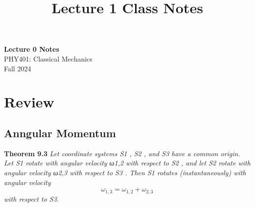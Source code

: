 \documentclass[11pt]{article}
\theoremstyle{definition}
\begin{document}
\setcounter{section}{0}
\title{Lecture 1 Class Notes}

\thispagestyle{empty}

\begin{center}
{\LARGE \bf Lecture 0 Notes}\\
{\large PHY401: Classical Mechanics}\\
Fall 2024
\end{center}


\tableofcontents


\section{Review}
\subsection{Anngular Momentum}
\textbf{Theorem 9.3} \textit{Let coordinate systems S1 , S2 , and S3 have a common origin. Let S1 rotate with angular velocity ω1,2 with respect to S2 , and let S2 rotate with angular velocity ω2,3 with respect to S3 . Then S1 rotates (instantaneously) with
angular velocity}
$$
\omega_{1,3} = \omega_{1,2} + \omega_{2,3}
$$
\textit{with respect to S3.}
\end{document}
